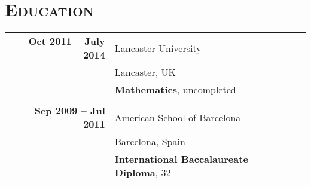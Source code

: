 \documentclass[a4paper,10pt]{article} %
\begin{document}
\section{\textsc{Education}}
\begin{tabularx}{\textwidth}{XrlXr}
  &  \textbf{Oct 2011 -- July 2014} & Lancaster University & &\\
  &                                 & Lancaster, UK & & \\
  &                                 & \textbf{Mathematics}, uncompleted & &\\
\multicolumn{5}{c}{}\\ %
  &  \textbf{Sep 2009 -- Jul 2011}  & American School of Barcelona & &\\
  &                                 & Barcelona, Spain & &\\
  &                                 & \textbf{International Baccalaureate Diploma}, 32 & &\\
\end{tabularx}

\end{document}

